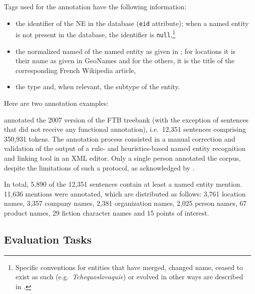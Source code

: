 Tags used for the annotation have the following information:
\begin{itemize}
    \item the identifier of the NE in the \aleda database (\texttt{eid} attribute); when a named entity is not present in the database, the identifier is \texttt{null},\footnote{Specific conventions for entities that have merged, changed name, ceased to exist as such (e.g.~\emph{Tchequoslovaquie}) or evolved in other ways are described in .}
    \item the normalized named of the named entity as given in \aleda; for locations it is their name as given in GeoNames and for the others, it is the title of the corresponding French Wikipedia article,
    \item the type and, when relevant, the subtype of the entity.
\end{itemize}
Here are two annotation examples:\\

 annotated the 2007 version of the FTB treebank (with the exception of sentences that did not receive any functional annotation), i.e.~12,351 sentences comprising 350,931 tokens. The annotation process consisted in a manual correction and validation of the output of a rule- and heuristics-based named entity recognition and linking tool in an XML editor.
Only a single person annotated the corpus, despite the limitations of such a protocol, as acknowledged by .

In total, 5,890 of the 12,351 sentences contain at least a named entity mention. 11,636 mentions were annotated, which are distributed as follows:
3,761 location names, 3,357 company names, 2,381 organization names, 2,025 person names, 67 product names, 29 fiction character names and 15 points of interest.


\subsection{Evaluation Tasks}\label{MethodEVAL}

